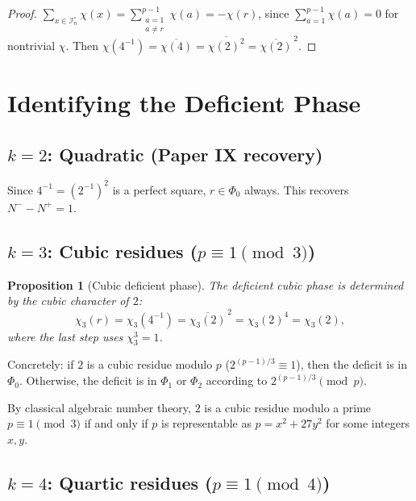 \documentclass[11pt, a4paper]{article}
\newtheorem{proposition}[theorem]{Proposition}
\theoremstyle{definition}
\theoremstyle{remark}
\begin{document}
\begin{proof}
$\displaystyle\sum_{x \in \mathcal{I}_n^\circ} \chi(x)
= \sum_{\substack{a=1\\a \ne r}}^{p-1} \chi(a)
= -\chi(r)$,
since $\sum_{a=1}^{p-1} \chi(a) = 0$ for nontrivial
$\chi$.
Then $\chi(4^{-1}) = \overline{\chi(4)}
= \overline{\chi(2)^2} = \overline{\chi(2)}^{\,2}$.
\end{proof}

\section{Identifying the Deficient Phase}\label{sec:phases}

\subsection{$k = 2$: Quadratic (Paper IX recovery)}

Since $4^{-1} = (2^{-1})^2$ is a perfect square,
$r \in \Phi_0$ always.
This recovers $N^- - N^+ = 1$.

\subsection{$k = 3$: Cubic residues
($p \equiv 1 \pmod{3}$)}

\begin{proposition}[Cubic deficient phase]
\label{prop:cubic}
The deficient cubic phase is determined by the cubic
character of $2$:
\[
    \chi_3(r) = \chi_3(4^{-1})
    = \overline{\chi_3(2)}^{\,2}
    = \chi_3(2)^4
    = \chi_3(2),
\]
where the last step uses $\chi_3^3 = 1$.
\end{proposition}

Concretely: if $2$ is a cubic residue modulo $p$
($2^{(p-1)/3} \equiv 1$), then the deficit is in $\Phi_0$.
Otherwise, the deficit is in $\Phi_1$ or $\Phi_2$
according to $2^{(p-1)/3} \pmod{p}$.

By classical algebraic number theory, $2$ is a cubic
residue modulo a prime $p \equiv 1 \pmod{3}$ if and
only if $p$ is representable as $p = x^2 + 27y^2$ for
some integers $x, y$.

\subsection{$k = 4$: Quartic residues
($p \equiv 1 \pmod{4}$)}
\end{document}
